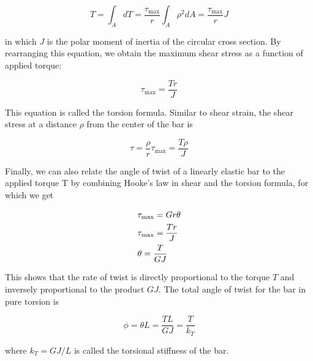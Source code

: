 \documentclass[
10pt,
a4paper,
openany,
svgnames,
]{book}
\begin{document}
\[T = \int_A {dT}  = \frac{\tau _{\max }}{r}\int_A \rho ^2dA  = \frac{\tau _{\max }}{r}J\]

in which $J$ is the polar moment of inertia of the circular cross section. By rearranging this equation, we obtain the maximum shear stress as a function of applied torque:

\begin{equation}
  \tau _{\max } = \frac{Tr}{J}
\end{equation}

This equation is called the torsion formula. Similar to shear strain, the shear stress at a distance $\rho$ from the center of the bar is

\begin{equation}
  \tau  = \frac{\rho }{r}\tau _{\max } = \frac{T\rho }{J}
\end{equation}

Finally, we can also relate the angle of twist of a linearly elastic bar to the applied torque T by combining Hooke’s law in shear and the torsion formula, for which we get

\[\begin{gathered}
    \tau _{\max } = Gr\theta \\
    \tau _{\max } = \frac{Tr}{J} \hfill \\
    \theta  = \frac{T}{GJ} \hfill \\ 
  \end{gathered} \]

This shows that the rate of twist is directly proportional to the torque $T$ and inversely proportional to the product $GJ$. The total angle of twist for the bar in pure torsion is

\begin{equation}
  \phi  = \theta L = \frac{TL}{GJ} = \frac{T}{k_T}
\end{equation}

where $k_T = GJ/L$ is called the torsional stiffness of the bar.
\end{document}
